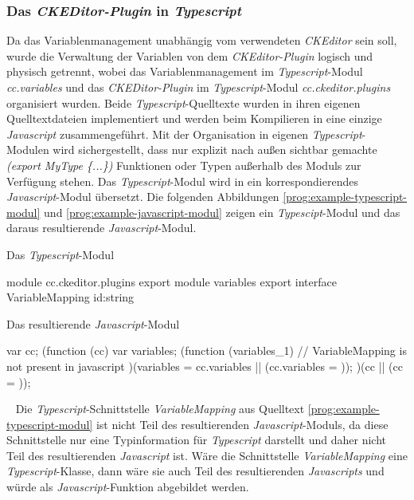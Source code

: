 \subsubsection{Das \emph{CKEDitor-Plugin} in \emph{Typescript}}
Da das Variablenmanagement unabhängig vom verwendeten \emph{CKEditor} sein soll, wurde die Verwaltung der Variablen von dem \emph{CKEditor-Plugin} logisch und physisch getrennt, wobei das Variablenmanagement im \emph{Typescript}-Modul \emph{cc.variables} und das \emph{CKEDitor-Plugin} im \emph{Typescript}-Modul \emph{cc.ckeditor.plugins} organisiert wurden. Beide \emph{Typescript}-Quelltexte wurden in ihren eigenen Quelltextdateien implementiert und werden beim Kompilieren in eine einzige \emph{Javascript} zusammengeführt. Mit der Organisation in eigenen \emph{Typescript}-Modulen wird sichergestellt, dass nur explizit nach außen sichtbar gemachte \emph{(export MyType \{...\})} Funktionen oder Typen außerhalb des Moduls zur Verfügung stehen. Das \emph{Typescript}-Modul wird in ein korrespondierendes \emph{Javascript}-Modul übersetzt. Die folgenden Abbildungen \ref{prog:example-typescript-modul} und \ref{prog:example-javascript-modul} zeigen ein \emph{Typescipt}-Modul und das daraus resultierende \emph{Javascript}-Modul.
\begin{program}[h]
\caption{Das \emph{Typescript}-Modul}
\label{prog:example-typescript-modul}
\begin{JsCode}[numbers=none]
module cc.ckeditor.plugins {
	export module variables {
		export interface VariableMapping{
	        id:string
		}
	}
}                  
\end{JsCode}
\end{program}
\begin{program}[h]
\caption{Das resultierende \emph{Javascript}-Modul}
\label{prog:example-javascript-modul}
\begin{JsCode}[numbers=none]
var cc;
(function (cc) {
    var variables;
    (function (variables_1) {
    // VariableMapping is not present in javascript
    })(variables = cc.variables || (cc.variables = {}));
})(cc || (cc = {}));                 
\end{JsCode}
\end{program}
\ \newline
Die \emph{Typescript}-Schnittstelle \emph{VariableMapping} aus Quelltext \ref{prog:example-typescript-modul} ist nicht Teil des resultierenden \emph{Javascript}-Moduls, da diese Schnittstelle nur eine Typinformation für \emph{Typescript} darstellt und daher nicht Teil des resultierenden \emph{Javascript} ist. Wäre die Schnittstelle \emph{VariableMapping} eine \emph{Typescript}-Klasse, dann wäre sie auch Teil des resultierenden \emph{Javascripts} und würde als \emph{Javascript}-Funktion abgebildet werden.
